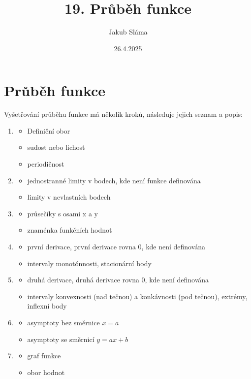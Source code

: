 \title{19. Průběh funkce}
\author{Jakub Sláma}
\date{26.4.2025}

\maketitle

\section{Průběh funkce}
Vyšetřování průběhu funkce má několik kroků, následuje jejich seznam a popis:
\begin{enumerate}
    \item 
        \begin{itemize}
            \item Definiční obor 
            \item sudost nebo lichost
            \item periodičnost
        \end{itemize}
    \item
        \begin{itemize}
            \item jednostranné limity v bodech, kde není funkce definována
            \item limity v nevlastních bodech
        \end{itemize}
    \item
        \begin{itemize}
            \item průsečíky s osami x a y
            \item znaménka funkčních hodnot
        \end{itemize}
    \item
        \begin{itemize}
            \item první derivace, první derivace rovna 0, kde není definována
            \item intervaly monotónnosti, stacionární body
        \end{itemize}
    \item
        \begin{itemize}
            \item druhá derivace, druhá derivace rovna 0, kde není definována
            \item intervaly konvexnosti (nad tečnou) a konkávnosti (pod tečnou), extrémy, inflexní body
        \end{itemize}
    \item
        \begin{itemize}
            \item asymptoty bez směrnice $x=a$
            \item asymptoty se směrnicí $y=ax+b$
        \end{itemize}
    \item
        \begin{itemize}
            \item graf funkce
            \item obor hodnot
        \end{itemize}
\end{enumerate}


